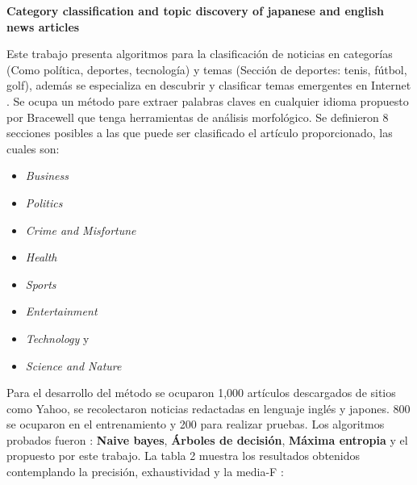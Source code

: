 \begin{large}
	 \textbf{Category classification and topic discovery of japanese and english news articles}\\
\end{large}


Este trabajo presenta algoritmos para la clasificación de noticias en categorías (Como política, deportes, tecnología) y temas (Sección de deportes: tenis, fútbol, golf), además se especializa en descubrir y clasificar temas emergentes en Internet \citep{CD6}. Se ocupa un método pare extraer palabras claves en cualquier idioma propuesto por Bracewell \cite{C2:T.Inter:Bracewell} que tenga herramientas de análisis morfológico. Se definieron 8 secciones posibles a las que puede ser clasificado el artículo proporcionado, las cuales son: 
\begin{itemize}

	\item \textit{Business} 
	\item \textit{Politics} 
	\item \textit{Crime and Misfortune} 
	\item \textit{Health} 
	\item \textit{Sports} 
	\item \textit{Entertainment} 
	\item \textit{Technology} y 
	\item \textit{Science and Nature}

\end{itemize}

Para el desarrollo del método se ocuparon 1,000 artículos descargados de sitios como Yahoo, se recolectaron noticias redactadas en lenguaje inglés y japones. 800 se ocuparon en el entrenamiento y 200 para realizar pruebas. Los algoritmos probados fueron : \textbf{Naive bayes}, \textbf{Árboles de decisión}, \textbf{Máxima entropia} y el propuesto por este trabajo. La tabla 2 muestra los resultados obtenidos contemplando la precisión, exhaustividad y la media-F : \\

